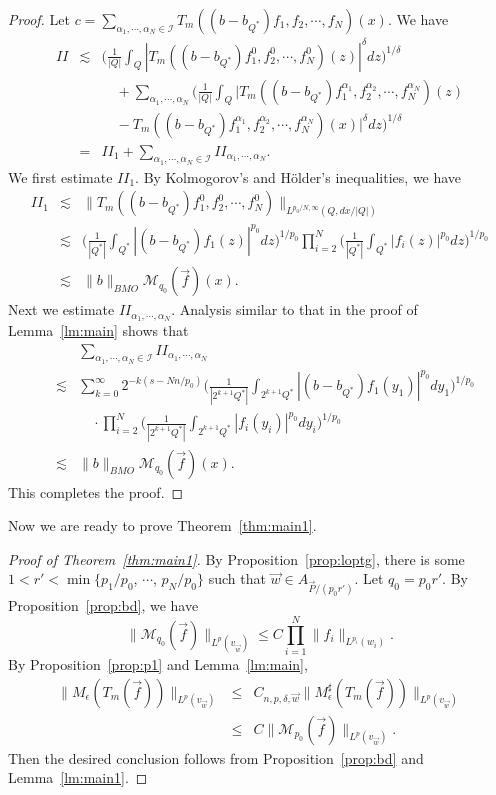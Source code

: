 \documentclass[11pt,oneside,onecolumn]{amsart}
\numberwithin{equation}{section}
\begin{document}
\begin{proof}
Let $c=\sum_{\alpha_1,\cdots,\alpha_N\in \mathcal{I}}T_m((b-b_{Q^*})f_1,f_2,\cdots,f_N)(x)$.
We have
\begin{eqnarray*}
II&\lesssim& \bigg(\frac{1}{|Q|}\int_Q |T_m((b-b_{Q^*})f_1^0,f_2^0,\cdots,f_N^0)(z)|^\delta dz\bigg)^{1/\delta}\\
&&\quad+\sum_{\alpha_1,\cdots, \alpha_N}\bigg(\frac{1}{|Q|}\int_Q |T_m((b-b_{Q^*})f_1^{\alpha_1},f_2^{\alpha_2},\cdots,f_N^{\alpha_N})(z)\\
&&\quad-T_m((b-b_{Q^*})f_1^{\alpha_1},f_2^{\alpha_2},\cdots,f_N^{\alpha_N})(x)|^\delta dz\bigg)^{1/\delta}\\
&=&II_1+\sum_{\alpha_1,\cdots,\alpha_N\in \mathcal{I}}II_{\alpha_1,\cdots,\alpha_N}.
\end{eqnarray*}
We first estimate $II_1$. By Kolmogorov's and H\"{o}lder's inequalities, we have
\begin{eqnarray*}
II_1&\lesssim& \|T_m((b-b_{Q^*})f_1^0,f_2^0,\cdots,f_N^0)\|_{L^{p_0/N,\infty}(Q,dx/{|Q|})}\\
&\lesssim& \bigg(\frac{1}{|Q^*|}\int_{Q^*} |(b-b_{Q^*})f_1(z)|^{p_0}dz\bigg)^{1/{p_0}}\prod_{i=2}^N
      \bigg(\frac{1}{|Q^*|}\int_{Q^*}|f_i(z)|^{p_0}dz\bigg)^{1/{p_0}}\\
&\lesssim& \|b\|^{}_{BMO}\mathcal{M}_{q_0}(\vec{f})(x).
\end{eqnarray*}
Next we estimate $II_{\alpha_1,\cdots,\alpha_N}$.
Analysis similar to that in the proof of Lemma~\ref{lm:main}
shows that 
\begin{eqnarray*}
&&\sum_{\alpha_1,\cdots,\alpha_N\in\mathcal{I}}II_{\alpha_1,\cdots,\alpha_N}\\
&\lesssim&\sum_{k=0}^\infty 2^{-k(s-Nn/{p_0})}\bigg(\frac{1}{|2^{k+1}Q^*|}\int_{2^{k+1}Q^*}|(b-b_{Q^*})f_1(y_1)|^{p_0}dy_1\bigg)^{1/{p_0}}\\
&&\quad\cdot \prod_{i=2}^N\bigg(\frac{1}{|2^{k+1}Q^*|}\int_{2^{k+1}Q^*}|f_i(y_i)|^{p_0}dy_i\bigg)^{1/{p_0}}\\
&\lesssim& \|b\|^{}_{BMO}\mathcal{M}_{q_0}(\vec{f})(x).
\end{eqnarray*}
This completes the proof.
\end{proof}

Now we are ready to prove Theorem~\ref{thm:main1}.
\begin{proof}[Proof of Theorem~\ref{thm:main1}]
By Proposition~\ref{prop:loptg}, there is some $1<r'<\min\{p_1/{p_0}$,
$\cdots$, $p_N/{p_0}\}$ such
that $\vec{w}\in A_{\vec{P}/{(p_0r')}}$. Let $q_0=p_0r'$. By Proposition~\ref{prop:bd}, we have
\[
  \|\mathcal{M}_{q_0}(\vec{f})\|_{L^p(v^{}_{\vec{w}})}\le C \prod_{i=1}^N \|f_i\|_{L^{p_i}(w_i)}.
\]
By Proposition~\ref{prop:p1} and Lemma~\ref{lm:main},
\begin{eqnarray*}
 \|M_\epsilon(T_m (\vec{f}))\|_{L^p(v_{\vec{w}})}
 &\le& C_{n,p,\delta, \vec{w}}\|M_\epsilon^\sharp(T_m (\vec{f}))\|_{L^p(v_{\vec{w}})}\\
 &\le& C\|\mathcal{M}_{p_0}(\vec{f})\|_{L^p(v_{\vec{w}})}.
\end{eqnarray*}
Then the desired conclusion follows from Proposition~\ref{prop:bd} and Lemma~\ref{lm:main1}.
\end{proof}
\end{document}
